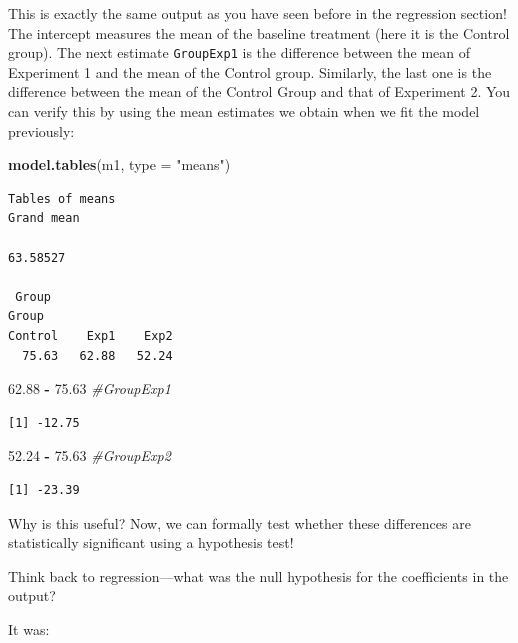 \documentclass[
  letterpaper,
]{book}
\newenvironment{Shaded}{\begin{snugshade}}{\end{snugshade}}
\newcommand{\AttributeTok}[1]{\textcolor[rgb]{0.13,0.29,0.53}{#1}}
\newcommand{\CommentTok}[1]{\textcolor[rgb]{0.56,0.35,0.01}{\textit{#1}}}
\newcommand{\FloatTok}[1]{\textcolor[rgb]{0.00,0.00,0.81}{#1}}
\newcommand{\FunctionTok}[1]{\textcolor[rgb]{0.13,0.29,0.53}{\textbf{#1}}}
\newcommand{\NormalTok}[1]{#1}
\newcommand{\SpecialCharTok}[1]{\textcolor[rgb]{0.81,0.36,0.00}{\textbf{#1}}}
\newcommand{\StringTok}[1]{\textcolor[rgb]{0.31,0.60,0.02}{#1}}
\begin{document}
This is exactly the same output as you have seen before in the
regression section! The intercept measures the mean of the baseline
treatment (here it is the Control group). The next estimate
\texttt{GroupExp1} is the difference between the mean of Experiment 1
and the mean of the Control group. Similarly, the last one is the
difference between the mean of the Control Group and that of Experiment
2. You can verify this by using the mean estimates we obtain when we fit
the model previously:

\begin{Shaded}
\begin{Highlighting}[]
\FunctionTok{model.tables}\NormalTok{(m1, }\AttributeTok{type =} \StringTok{"means"}\NormalTok{)}
\end{Highlighting}
\end{Shaded}

\begin{verbatim}
Tables of means
Grand mean
         
63.58527 

 Group 
Group
Control    Exp1    Exp2 
  75.63   62.88   52.24 
\end{verbatim}

\begin{Shaded}
\begin{Highlighting}[]
\FloatTok{62.88} \SpecialCharTok{{-}} \FloatTok{75.63} \CommentTok{\#GroupExp1}
\end{Highlighting}
\end{Shaded}

\begin{verbatim}
[1] -12.75
\end{verbatim}

\begin{Shaded}
\begin{Highlighting}[]
\FloatTok{52.24} \SpecialCharTok{{-}} \FloatTok{75.63} \CommentTok{\#GroupExp2 }
\end{Highlighting}
\end{Shaded}

\begin{verbatim}
[1] -23.39
\end{verbatim}

Why is this useful? Now, we can formally test whether these differences
are statistically significant using a hypothesis test!

Think back to regression---what was the null hypothesis for the
coefficients in the output?

It was:
\end{document}
